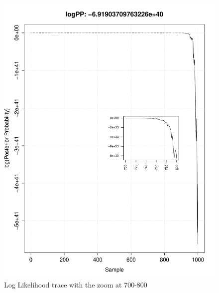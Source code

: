 \documentclass[11pt]{labbook}
\begin{document}
    \begin{figure}
        \centering
        \includegraphics[scale=.75]{FONSE_Plots/2016/June_29/LogLikeTrace_700-800}
        \caption{Log Likelihood trace with the zoom at 700-800}
        \label{fig:JUN29_700-800}
    \end{figure}
\end{document}
